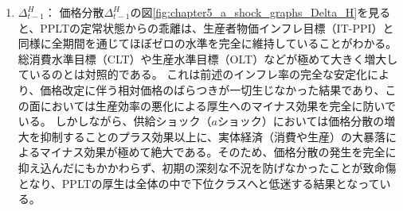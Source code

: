 \begin{enumerate}
        生産者物価水準を目標経路に厳格に固定しようとする強力なメカニズムが働くため、供給ショックに伴う物価変動圧力を完全に封じ込め、国内生産財のインフレ率の変動を完全に抑制している。このインフレ率の完全な安定化が、次項で述べる価格分散の蓄積を回避する最大の要因となっている。
    \item
    \label{itm:chapter5_a_shock_policies_pplt_Delta_t_minus_1_H}
        \(\Delta_{t-1}^H\)：
        価格分散\(\Delta_{t-1}^H\)の図\ref{fig:chapter5_a_shock_graphs_Delta_H}を見ると、PPLTの定常状態からの乖離は、生産者物価インフレ目標（IT-PPI）と同様に全期間を通じてほぼゼロの水準を完全に維持していることがわかる。
        総消費水準目標（CLT）や生産水準目標（OLT）などが極めて大きく増大しているのとは対照的である。
        これは前述のインフレ率の完全な安定化により、価格改定に伴う相対価格のばらつきが一切生じなかった結果であり、この面においては生産効率の悪化による厚生へのマイナス効果を完全に防いでいる。
        しかしながら、供給ショック（\(a\)ショック）においては価格分散の増大を抑制することのプラス効果以上に、実体経済（消費や生産）の大暴落によるマイナス効果が極めて絶大である。そのため、価格分散の発生を完全に抑え込んだにもかかわらず、初期の深刻な不況を防げなかったことが致命傷となり、PPLTの厚生は全体の中で下位クラスへと低迷する結果となっている。
\end{enumerate}